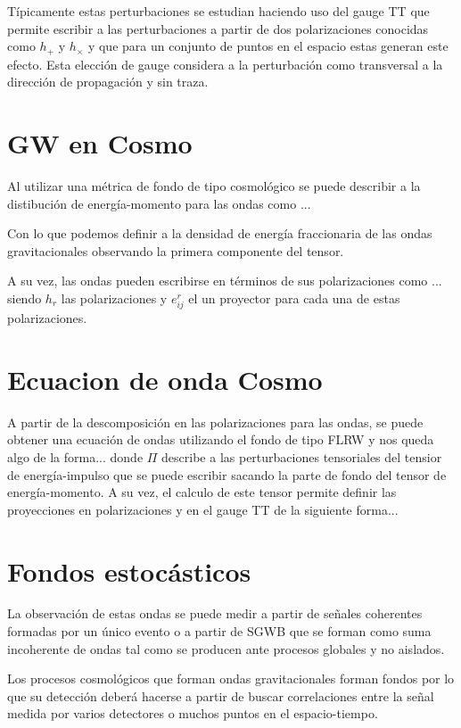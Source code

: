 \documentclass[letterpaper,12pt]{report}
\begin{document}
    Típicamente estas perturbaciones se estudian haciendo uso del gauge TT que permite escribir a las perturbaciones a partir de dos polarizaciones conocidas como $h_+$ y $h_\times$ y que para un conjunto de puntos en el espacio estas generan este efecto. Esta elección de gauge considera a la perturbación como transversal a la dirección de propagación y sin traza.

  \section{GW en Cosmo}
    Al utilizar una métrica de fondo de tipo cosmológico se  puede describir a la distibución de energía-momento para las ondas como ... 

    Con lo que podemos definir a la densidad de energía fraccionaria de las ondas gravitacionales observando la primera componente del tensor.
    
    A su vez, las ondas pueden escribirse en términos de sus polarizaciones como ... siendo $h_r$ las polarizaciones y $e_{ij}^r$ el un proyector para cada una de estas polarizaciones.

  \section{Ecuacion de onda Cosmo}
    A partir de la descomposición en las polarizaciones para las ondas, se puede obtener una ecuación de ondas utilizando el fondo de tipo FLRW y nos queda algo de la forma... donde $\Pi$ describe a las perturbaciones tensoriales del tensior de energía-impulso que se puede escribir sacando la parte de fondo del tensor de energía-momento. A su vez, el calculo de este tensor permite definir las proyecciones en polarizaciones y en el gauge TT de la siguiente forma...

  \section{Fondos estocásticos}
    La observación de estas ondas se puede medir a partir de señales coherentes formadas por un único evento o a partir de SGWB que se forman como suma incoherente de ondas tal como se producen ante procesos globales y no aislados.

    Los procesos cosmológicos que forman ondas gravitacionales forman fondos por lo que su detección deberá hacerse a partir de buscar correlaciones entre la señal medida por varios detectores o muchos puntos en el espacio-tiempo.
\end{document}
